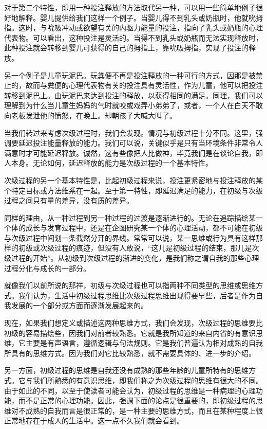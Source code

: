 \documentclass[UTF8,10pt,a4paper,openany]{book}
\begin{document}
对于第二个特性，即用一种投注释放的方法取代另一种，可以用一些简单地例子很好地解释。婴儿提供给我们这样一个例子。当婴儿得不到乳头或奶瓶时，他就吮拇指。这时，与吮吸冲动或欲望有关的内驱力能量的投注，指向了乳头或奶瓶的心理代表物。可以看出，这种投注是灵活的。当得不到乳头或奶瓶而无法实现释放时，此种投注就会转移到婴儿可获得的自己的拇指上，靠吮吸拇指，实现了投注的释放。

另一个例子是儿童玩泥巴。玩粪便不再是投注释放的一种可行的方式，因那是被禁止的，故而与粪便的心理代表物有关的投注具有灵活性，作为儿童，他可以把投注转移到泥巴上。由玩泥巴来达到投注的释放，以获得相同的满足。同理，我们可以理解到为什么当儿童生妈妈的气时就咬或戏弄小弟弟了，或者，一个人在白天不敢向老板发泄他的愤怒，在晚上。却朝孩子大喊大叫了。

当我们转过来考虑次级过程时，我们会发现。情况与初级过程十分不同。这里，强调要延迟投注能量释放的能力。我们可以说，关键似乎是只有当环境条件非常令人满意时才可能延迟释放。诚然，这有些像把人比做神，毕竟我们是在谈论自我，即人本身。无论如何，延迟释放的能力是次级过程的一个基本特性。

次级过程的另一个基本特性是，比起初级过程来说，投注更紧密地与投注释放的某个特定目标或方法维系在一起。至于第一特性，即延迟满足的能力，在初级与次级过程之间只有量的差异，没有质的差异。

同样的理由，从一种过程到另一种过程的过渡是逐渐进行的。无论在追踪描绘某一个体的成长与发育过程中，还是在企图研究某一个体的心理活动，都不可能在初级与次级过程中间划一条截然分开的界线。常常可以说，某一思维或行为具有这样那样的初级或次级过程的痕迹，但没有人敢说，“这儿是初级过程的结束，那儿是次级过程的开始”。从初级到次级过程的渐进的变化，是我们称之谓自我的那些心理过程分化与成长的一部分。

就像我们以前所说的那祥，初级与次级过程也可以指两种不同类型的思维或思维方式。我们认为，生活中初级过程思维比次级过程思维出现得要早些，后者是作为自我发展的一个部分或方面而逐渐发展起来的。

现在，如果我们想定义或描述这两种思维方式，我们会发现，次级过程的思维要比初级的容易描绘些，因我们对前者较熟悉。它就是我所知道的来自内省的有意识思维，它主要是有声语言，遵循逻辑与句法规则。它是我们普遍认为相对成熟的自我所具有的思维方式。因为我们对它比较熟悉，就不需要具体的、进一步的介绍。

另一方面，初级过程的思维是自我还没有成熟的那些年龄的儿童所特有的思维方式。它与我们所熟悉的有意识思维，即我们称之为次级过程的思维有很大的不同。由于如此的不同，以至于使读者可能会认为，初级过程的思维是一种病理的心理功能，而不是正常的心理功能。因此，强调下面的论点是很重要的，即初级过程的思维对不成熟的自我而言是很正常的，是一种主要的思维方式，而且在某种程度上很正常地存在于成人的生活中。这一点不久我们就会看到。
\end{document}
